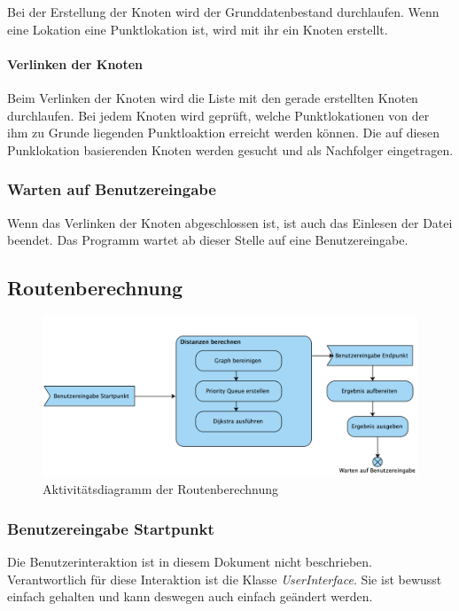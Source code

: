 \documentclass[12pt, a4paper, ngerman]{article}
\begin{document}
Bei der Erstellung der Knoten wird der Grunddatenbestand durchlaufen. Wenn eine Lokation eine Punktlokation ist, wird mit ihr ein Knoten erstellt. 

\paragraph{Verlinken der Knoten} 
Beim Verlinken der Knoten wird die Liste mit den gerade erstellten Knoten durchlaufen. Bei jedem Knoten wird geprüft, welche Punktlokationen von der ihm zu Grunde liegenden Punktloaktion erreicht werden können. Die auf diesen Punklokation basierenden Knoten werden gesucht und als Nachfolger eingetragen.

\subsubsection{Warten auf Benutzereingabe}
Wenn das Verlinken der Knoten abgeschlossen ist, ist auch das Einlesen der Datei beendet. Das Programm wartet ab dieser Stelle auf eine Benutzereingabe.

\subsection{Routenberechnung}

\begin{figure}[H] 
  \centering
     \includegraphics[width=1.0\textwidth]{Grafiken/aktivitaetsDiagrammDijkstra.jpg}
  \caption{Aktivitätsdiagramm der Routenberechnung}
  \label{fig:uebersichtRoutenberechnung}
\end{figure}

\subsubsection{Benutzereingabe Startpunkt}
Die Benutzerinteraktion ist in diesem Dokument nicht beschrieben. Verantwortlich für diese Interaktion ist die Klasse \textit{UserInterface}. Sie ist bewusst einfach gehalten und kann deswegen auch einfach geändert werden.
\end{document}
